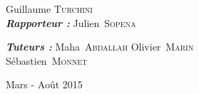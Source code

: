\documentclass[11pt]{article}
\begin{document}
\begin{titlepage}
\begin{sffamily}
\begin{center}
    \begin{minipage}{0.4\textwidth}
      \begin{flushleft} \large
        Guillaume \textsc{Turchini}\\[0.5cm]
				\textbf{\emph{Rapporteur :}} Julien~\textsc{Sopena}
      \end{flushleft}
    \end{minipage}
    \begin{minipage}{0.4\textwidth}
      \begin{flushright} \large
				\textbf{\emph{Tuteurs :}} Maha~\textsc{Abdallah} Olivier~\textsc{Marin} \\Sébastien~\textsc{Monnet}
      \end{flushright}
    \end{minipage}

    \vfill

    {\large Mars - Août 2015}

  \end{center}
  \end{sffamily}
\end{titlepage}


\tableofcontents













\end{document}
